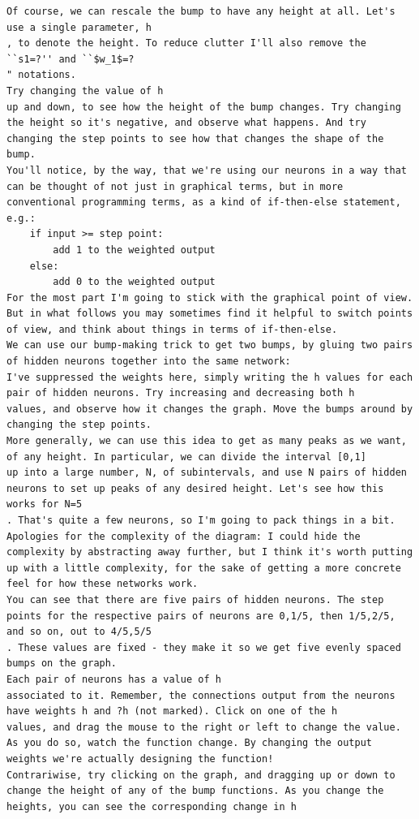 \begin{lstlisting}
Of course, we can rescale the bump to have any height at all. Let's use a single parameter, h
, to denote the height. To reduce clutter I'll also remove the ``s1=?'' and ``$w_1$=?
" notations.
Try changing the value of h
up and down, to see how the height of the bump changes. Try changing the height so it's negative, and observe what happens. And try changing the step points to see how that changes the shape of the bump.
You'll notice, by the way, that we're using our neurons in a way that can be thought of not just in graphical terms, but in more conventional programming terms, as a kind of if-then-else statement, e.g.:
    if input >= step point:
        add 1 to the weighted output
    else:
        add 0 to the weighted output
For the most part I'm going to stick with the graphical point of view. But in what follows you may sometimes find it helpful to switch points of view, and think about things in terms of if-then-else.
We can use our bump-making trick to get two bumps, by gluing two pairs of hidden neurons together into the same network:
I've suppressed the weights here, simply writing the h values for each pair of hidden neurons. Try increasing and decreasing both h
values, and observe how it changes the graph. Move the bumps around by changing the step points.
More generally, we can use this idea to get as many peaks as we want, of any height. In particular, we can divide the interval [0,1]
up into a large number, N, of subintervals, and use N pairs of hidden neurons to set up peaks of any desired height. Let's see how this works for N=5
. That's quite a few neurons, so I'm going to pack things in a bit. Apologies for the complexity of the diagram: I could hide the complexity by abstracting away further, but I think it's worth putting up with a little complexity, for the sake of getting a more concrete feel for how these networks work.
You can see that there are five pairs of hidden neurons. The step points for the respective pairs of neurons are 0,1/5, then 1/5,2/5, and so on, out to 4/5,5/5
. These values are fixed - they make it so we get five evenly spaced bumps on the graph.
Each pair of neurons has a value of h
associated to it. Remember, the connections output from the neurons have weights h and ?h (not marked). Click on one of the h
values, and drag the mouse to the right or left to change the value. As you do so, watch the function change. By changing the output weights we're actually designing the function!
Contrariwise, try clicking on the graph, and dragging up or down to change the height of any of the bump functions. As you change the heights, you can see the corresponding change in h

\end{lstlisting}
